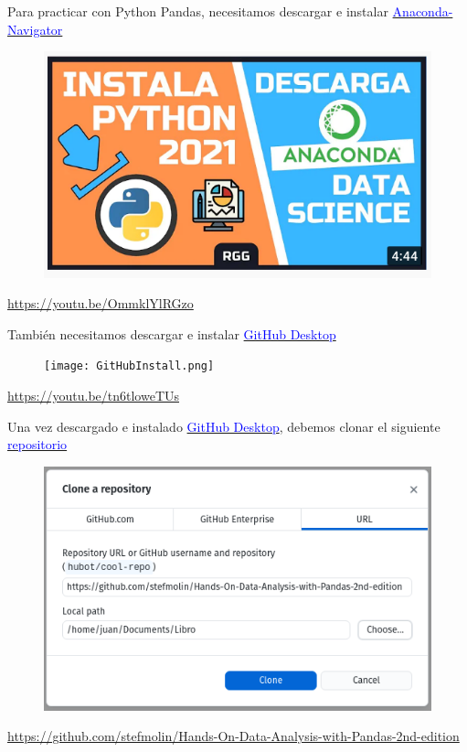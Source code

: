\documentclass[aspectratio=169]{beamer}
\begin{document}
\begin{frame}
Para practicar con Python Pandas, necesitamos descargar e instalar \href{https://www.anaconda.com/products/individual}{\textcolor{blue}{Anaconda-Navigator}}
\centering
\begin{figure}
\centering
 \includegraphics[width=.65\textwidth]{Install.png}
\end{figure}
\textcolor{blue}{\url{https://youtu.be/OmmklYlRGzo}}
\end{frame}

\begin{frame}
También necesitamos descargar e instalar \href{https://desktop.github.com/}{\textcolor{blue}{GitHub Desktop}}
\centering
\begin{figure}
\centering
 \texttt{[image: GitHubInstall.png]}
\end{figure}
\textcolor{blue}{\url{https://youtu.be/tn6tloweTUs}}
\end{frame}


\begin{frame}
Una vez descargado e instalado \href{https://desktop.github.com/}{\textcolor{blue}{GitHub Desktop}}, debemos clonar el siguiente \href{https://github.com/stefmolin/Hands-On-Data-Analysis-with-Pandas-2nd-edition}{\textcolor{blue}{repositorio}}
\centering
\begin{figure}
\centering
 \includegraphics[width=.65\textwidth]{Clonar.png}
\end{figure}
\scriptsize
\textcolor{blue}{\url{https://github.com/stefmolin/Hands-On-Data-Analysis-with-Pandas-2nd-edition}}
\end{frame}
\end{document}

